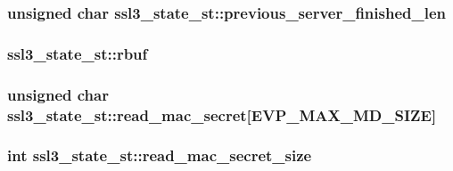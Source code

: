 \subsubsection[{\texorpdfstring{previous\+\_\+server\+\_\+finished\+\_\+len}{previous_server_finished_len}}]{\setlength{\rightskip}{0pt plus 5cm}unsigned char ssl3\+\_\+state\+\_\+st\+::previous\+\_\+server\+\_\+finished\+\_\+len}\hypertarget{structssl3__state__st_a9c8db98973217ed7e43f30861094f2e0}{}\label{structssl3__state__st_a9c8db98973217ed7e43f30861094f2e0}
\subsubsection[{\texorpdfstring{rbuf}{rbuf}}]{ ssl3\+\_\+state\+\_\+st\+::rbuf}\hypertarget{structssl3__state__st_afe5098e88b32cad3b79243f2b53f6040}{}\label{structssl3__state__st_afe5098e88b32cad3b79243f2b53f6040}
\subsubsection[{\texorpdfstring{read\+\_\+mac\+\_\+secret}{read_mac_secret}}]{\setlength{\rightskip}{0pt plus 5cm}unsigned char ssl3\+\_\+state\+\_\+st\+::read\+\_\+mac\+\_\+secret\mbox{[}{\bf E\+V\+P\+\_\+\+M\+A\+X\+\_\+\+M\+D\+\_\+\+S\+I\+ZE}\mbox{]}}\hypertarget{structssl3__state__st_a650dfa61b083a05fafa16b3c62d6fe69}{}\label{structssl3__state__st_a650dfa61b083a05fafa16b3c62d6fe69}
\subsubsection[{\texorpdfstring{read\+\_\+mac\+\_\+secret\+\_\+size}{read_mac_secret_size}}]{\setlength{\rightskip}{0pt plus 5cm}int ssl3\+\_\+state\+\_\+st\+::read\+\_\+mac\+\_\+secret\+\_\+size}\hypertarget{structssl3__state__st_a5f9e172ca1b931c4bb0bb44e80898d15}{}\label{structssl3__state__st_a5f9e172ca1b931c4bb0bb44e80898d15}
